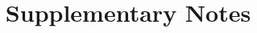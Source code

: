 \documentclass[11pt,a4paper]{article}
\title{Supplementary Notes}
\author{}
\date{}
\newcommand{\suppnote}[1]{\clearpage\FloatBarrier}
\begin{document}
\maketitle
\providecommand{\benchmarkroot}{../..}
\providecommand{\suppfigroot}{.}
\providecommand{\supptablepath}{../tables}
\setcounter{subsection}{0}
\renewcommand{\thesubsection}{\arabic{subsection}}

\suppnote{analysis-of-published-datasets}
\suppnote{comparison-delt-deli}
\suppnote{statistical-methods}
\suppnote{enrichment-scores-comparison}
\suppnote{reaction-graph-advanced}



\end{document}

